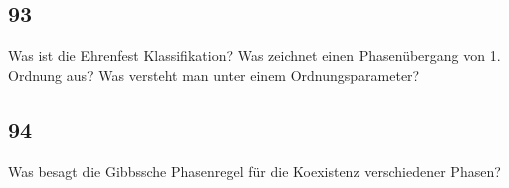 \documentclass[12pt,a4paper]{report}
\newenvironment{myfrag}{\begin{it}}{\end{it}\vspace{3mm}\par}
\numberwithin{equation}{section}
\begin{document}
\subsection{93}
\begin{myfrag}
Was ist die Ehrenfest Klassifikation? Was zeichnet einen Phasenübergang von 1.
Ordnung aus? Was versteht man unter einem Ordnungsparameter?
\end{myfrag}
\subsection{94}
\begin{myfrag}
Was besagt die Gibbssche Phasenregel für die Koexistenz verschiedener Phasen?
\end{myfrag}
\end{document}
